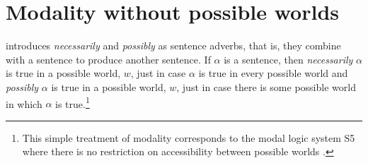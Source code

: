 



\section{Modality without possible worlds}

\cite{Montague1973} introduces \textit{necessarily} and
\textit{possibly} as sentence adverbs, that is, they combine with a
sentence to produce another sentence. If $\alpha$ is a sentence, then
\textit{necessarily} $\alpha$ is true in a possible world, $w$, just in case $\alpha$ is true in
every possible world and \textit{possibly} $\alpha$ is true in a
possible world, $w$, just in case there is some possible world in
which $\alpha$ is true.\footnote{This simple treatment of modality
  corresponds to the modal logic system S5 where there is no
  restriction on accessibility between possible worlds
  \citep{HughesCresswel1968,HughesCresswell1996}.}

